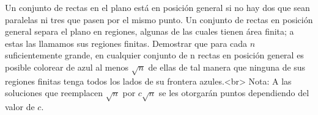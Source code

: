 Un conjunto de rectas en el plano está en posición general si no hay dos que sean paralelas ni tres que pasen por el mismo punto. Un conjunto de rectas en posición general separa el plano en regiones, algunas de las cuales tienen área finita; a estas las llamamos sus regiones finitas. Demostrar que para cada $n$ suficientemente grande, en cualquier conjunto de n rectas en posición general es posible colorear de azul al menos $\sqrt{n}$ de ellas de tal manera que ninguna de sus regiones finitas tenga todos los lados de su frontera azules.<br>
Nota: A las soluciones que reemplacen $\sqrt{n}$ por $c\sqrt{n}$ se les otorgarán puntos dependiendo del valor de $c$.